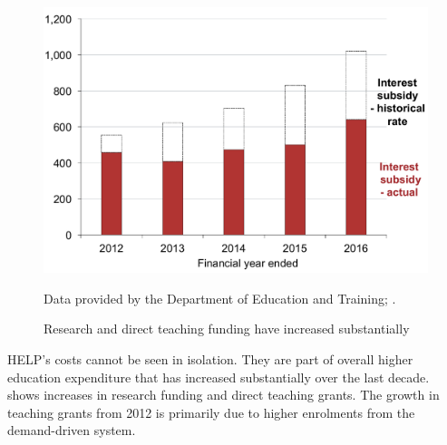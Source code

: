 \documentclass[embargoed]{grattan}
\begin{document}
\begin{figure}
\caption{Research and direct teaching funding have increased substantially\label{fig:fig12-research-direct-teaching-funding-have-increased-substantially}}


\includegraphics[page=12]{atlas/Chartpack.pdf}

{Data provided by the Department of Education and Training; \textcites{Australia2014HigherEducationResearcha}{ABS2015ConsumerPriceIndex}.}
\end{figure}


\gls{HELP}'s costs cannot be seen in isolation.
They are part of overall higher education expenditure that has increased substantially over the last decade.
 shows increases in research funding and direct teaching grants.
The growth in teaching grants from 2012 is primarily due to higher enrolments from the demand-driven system.
\end{document}
